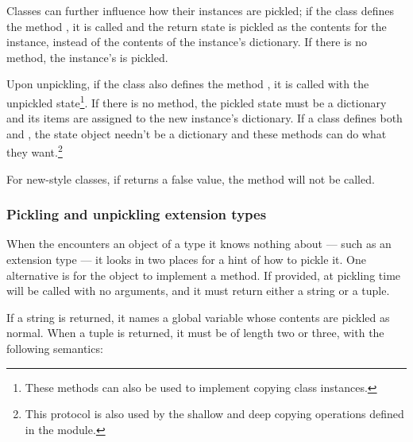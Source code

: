 
Classes can further influence how their instances are pickled; if the
class defines the method , it is called and the
return state is pickled as the contents for the instance, instead of
the contents of the instance's dictionary.  If there is no
 method, the instance's  is
pickled.

Upon unpickling, if the class also defines the method
, it is called with the unpickled
state\footnote{These methods can also be used to implement copying
class instances.}.  If there is no  method, the
pickled state must be a dictionary and its items are assigned to the
new instance's dictionary.  If a class defines both
 and , the state object
needn't be a dictionary and these methods can do what they
want.\footnote{This protocol is also used by the shallow and deep
copying operations defined in the
 module.}

\begin{notice}[warning]
  For new-style classes, if  returns a false
  value, the  method will not be called.
\end{notice}


\subsubsection{Pickling and unpickling extension types}

When the  encounters an object of a type it knows
nothing about --- such as an extension type --- it looks in two places
for a hint of how to pickle it.  One alternative is for the object to
implement a  method.  If provided, at pickling
time  will be called with no arguments, and it
must return either a string or a tuple.

If a string is returned, it names a global variable whose contents are
pickled as normal.  When a tuple is returned, it must be of length two
or three, with the following semantics:


